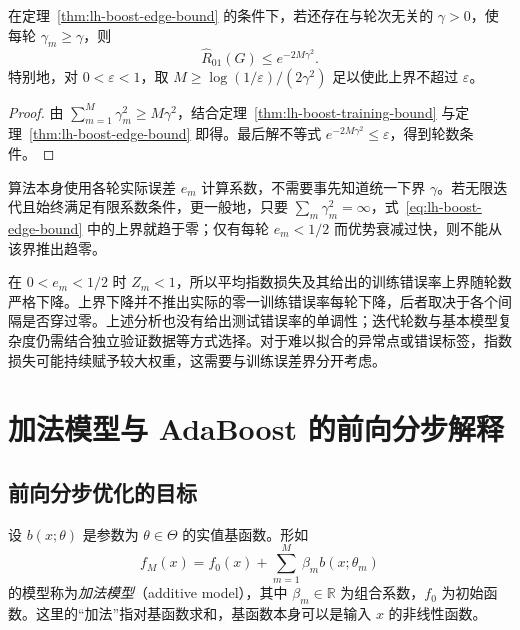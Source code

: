 \begin{corollary}
\label{cor:lh-boost-uniform-edge}
在定理~\ref{thm:lh-boost-edge-bound} 的条件下，若还存在与轮次无关的 $\gamma>0$，使每轮 $\gamma_m\geq\gamma$，则
\begin{equation}
 \widehat R_{01}(G)\leq e^{-2M\gamma^2}.
 \label{eq:lh-boost-uniform-edge}
\end{equation}
特别地，对 $0<\varepsilon<1$，取 $M\geq\log(1/\varepsilon)/(2\gamma^2)$ 足以使此上界不超过 $\varepsilon$。
\end{corollary}
\begin{proof}
由 $\sum_{m=1}^{M}\gamma_m^2\geq M\gamma^2$，结合定理~\ref{thm:lh-boost-training-bound} 与定理~\ref{thm:lh-boost-edge-bound} 即得。最后解不等式 $e^{-2M\gamma^2}\leq\varepsilon$，得到轮数条件。
\end{proof}

算法本身使用各轮实际误差 $e_m$ 计算系数，不需要事先知道统一下界 $\gamma$。若无限迭代且始终满足有限系数条件，更一般地，只要 $\sum_m\gamma_m^2=\infty$，式~\eqref{eq:lh-boost-edge-bound} 中的上界就趋于零；仅有每轮 $e_m<1/2$ 而优势衰减过快，则不能从该界推出趋零。

\begin{notealert}[type=caution,title={下降的量与结论的范围}]
在 $0<e_m<1/2$ 时 $Z_m<1$，所以平均指数损失及其给出的训练错误率上界随轮数严格下降。上界下降并不推出实际的零一训练错误率每轮下降，后者取决于各个间隔是否穿过零。上述分析也没有给出测试错误率的单调性；迭代轮数与基本模型复杂度仍需结合独立验证数据等方式选择。对于难以拟合的异常点或错误标签，指数损失可能持续赋予较大权重，这需要与训练误差界分开考虑。
\end{notealert}

\section{加法模型与 AdaBoost 的前向分步解释}
\label{sec:lh-boost-stagewise}

\subsection{前向分步优化的目标}
\label{subsec:lh-boost-additive}

\begin{definition}
\label{def:lh-boost-additive}
设 $b(x;\theta)$ 是参数为 $\theta\in\Theta$ 的实值基函数。形如
\begin{equation}
 f_M(x)=f_0(x)+\sum_{m=1}^{M}\beta_mb(x;\theta_m)
 \label{eq:lh-boost-additive-model}
\end{equation}
的模型称为\emph{加法模型}（additive model），其中 $\beta_m\in\mathbb R$ 为组合系数，$f_0$ 为初始函数。这里的“加法”指对基函数求和，基函数本身可以是输入 $x$ 的非线性函数。
\end{definition}

